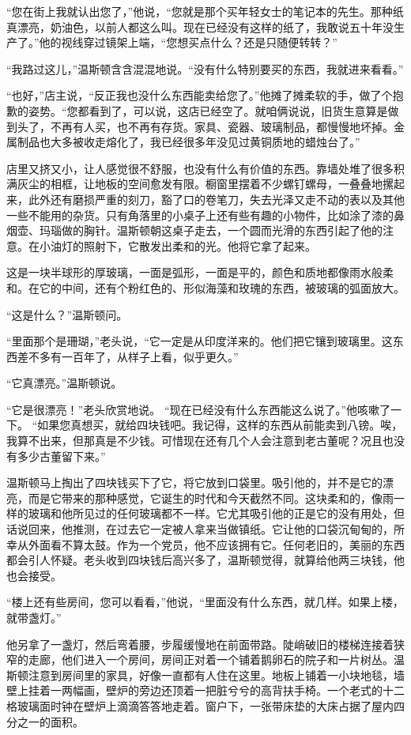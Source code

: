 ``您在街上我就认出您了，''他说，``您就是那个买年轻女士的笔记本的先生。那种纸真漂亮，奶油色，以前人都这么叫。现在已经没有这样的纸了，我敢说五十年没生产了。''他的视线穿过镜架上端，``您想买点什么？还是只随便转转？''

``我路过这儿，''温斯顿含含混混地说。``没有什么特别要买的东西，我就进来看看。''

``也好，''店主说，``反正我也没什么东西能卖给您了。''他摊了摊柔软的手，做了个抱歉的姿势。``您都看到了，可以说，这店已经空了。就咱俩说说，旧货生意算是做到头了，不再有人买，也不再有存货。家具、瓷器、玻璃制品，都慢慢地坏掉。金属制品也大多被收走熔化了，我已经很多年没见过黄铜质地的蜡烛台了。''

店里又挤又小，让人感觉很不舒服，也没有什么有价值的东西。靠墙处堆了很多积满灰尘的相框，让地板的空间愈发有限。橱窗里摆着不少螺钉螺母，一叠叠地摞起来，此外还有磨损严重的刻刀，豁了口的卷笔刀，失去光泽又走不动的表以及其他一些不能用的杂货。只有角落里的小桌子上还有些有趣的小物件，比如涂了漆的鼻烟壶、玛瑙做的胸针。温斯顿朝这桌子走去，一个圆而光滑的东西引起了他的注意。在小油灯的照射下，它散发出柔和的光。他将它拿了起来。

这是一块半球形的厚玻璃，一面是弧形，一面是平的，颜色和质地都像雨水般柔和。在它的中间，还有个粉红色的、形似海藻和玫瑰的东西，被玻璃的弧面放大。

``这是什么？''温斯顿问。

``里面那个是珊瑚，''老头说，``它一定是从印度洋来的。他们把它镶到玻璃里。这东西差不多有一百年了，从样子上看，似乎更久。''

``它真漂亮。''温斯顿说。

``它是很漂亮！''老头欣赏地说。
``现在已经没有什么东西能这么说了。''他咳嗽了一下。
``如果您真想买，就给四块钱吧。我记得，这样的东西从前能卖到八镑。唉，我算不出来，但那真是不少钱。可惜现在还有几个人会注意到老古董呢？况且也没有多少古董留下来。''

温斯顿马上掏出了四块钱买下了它，将它放到口袋里。吸引他的，并不是它的漂亮，而是它带来的那种感觉，它诞生的时代和今天截然不同。这块柔和的，像雨一样的玻璃和他所见过的任何玻璃都不一样。它尤其吸引他的正是它的没有用处，但话说回来，他推测，在过去它一定被人拿来当做镇纸。它让他的口袋沉甸甸的，所幸从外面看不算太鼓。作为一个党员，他不应该拥有它。任何老旧的，美丽的东西都会引人怀疑。老头收到四块钱后高兴多了，温斯顿觉得，就算给他两三块钱，他也会接受。

``楼上还有些房间，您可以看看，''他说，``里面没有什么东西，就几样。如果上楼，
就带盏灯。''

他另拿了一盏灯，然后弯着腰，步履缓慢地在前面带路。陡峭破旧的楼梯连接着狭窄的走廊，他们进入一个房间，房间正对着一个铺着鹅卵石的院子和一片树丛。温斯顿注意到房间里的家具，好像一直都有人住在这里。地板上铺着一小块地毯，墙壁上挂着一两幅画，壁炉的旁边还顶着一把脏兮兮的高背扶手椅。一个老式的十二格玻璃面时钟在壁炉上滴滴答答地走着。窗户下，一张带床垫的大床占据了屋内四分之一的面积。

